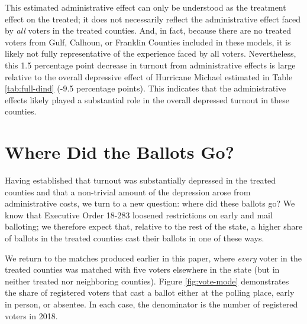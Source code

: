 \documentclass[
  12pt,
]{article}
\begin{document}
This estimated administrative effect can only be understood as the treatment effect on the treated; it does not necessarily reflect the administrative effect faced by \emph{all} voters in the treated counties. And, in fact, because there are no treated voters from Gulf, Calhoun, or Franklin Counties included in these models, it is likely not fully representative of the experience faced by all voters. Nevertheless, this 1.5 percentage point decrease in turnout from administrative effects is large relative to the overall depressive effect of Hurricane Michael estimated in Table \ref{tab:full-dind} (-9.5 percentage points). This indicates that the administrative effects likely played a substantial role in the overall depressed turnout in these counties.

\hypertarget{where-did-the-ballots-go}{%
\section*{Where Did the Ballots Go?}\label{where-did-the-ballots-go}}

Having established that turnout was substantially depressed in the treated counties and that a non-trivial amount of the depression arose from administrative costs, we turn to a new question: where did these ballots go? We know that Executive Order 18-283 loosened restrictions on early and mail balloting; we therefore expect that, relative to the rest of the state, a higher share of ballots in the treated counties cast their ballots in one of these ways.

We return to the matches produced earlier in this paper, where \emph{every} voter in the treated counties was matched with five voters elsewhere in the state (but in neither treated nor neighboring counties). Figure \ref{fig:vote-mode} demonstrates the share of registered voters that cast a ballot either at the polling place, early in person, or absentee. In each case, the denominator is the number of registered voters in 2018.
\end{document}
